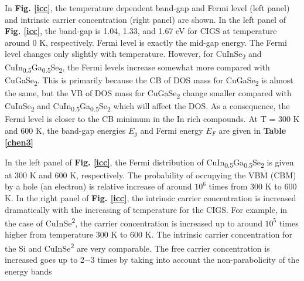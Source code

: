 \documentclass[a4paper, 12pt, titlepage,oneside,drop]{kthesis}
\begin{document}
In \textbf{Fig. \ref{icc}}, the temperature dependent band-gap and Fermi level (left panel) and intrinsic carrier concentration (right panel) are shown.  In the left panel of \textbf{Fig. \ref{icc}}, the band-gap is 1.04, 1.33,
and 1.67 eV for CIGS at temperature around 0 K, respectively. Fermi level is exactly the mid-gap energy. The Fermi level changes only slightly with temperature. However, 
for CuInSe\textsubscript{2} and CuIn\textsubscript{0.5}Ga\textsubscript{0.5}Se\textsubscript{2}, the Fermi levels increase somewhat more compared with CuGaSe\textsubscript{2}. This is primarily because the CB of DOS mass for 
CuGaSe\textsubscript{2} is almost the same, but the VB of DOS mass for CuGaSe\textsubscript{2} change smaller compared with CuInSe\textsubscript{2} and CuIn\textsubscript{0.5}Ga\textsubscript{0.5}Se\textsubscript{2} which will 
affect the DOS. As a consequence, the Fermi level is closer to the CB minimum in the In rich compounds. At T = 300 K and 600 K, the band-gap energies $E_g$ and Fermi energy $E_F$ are given in \textbf{Table \ref{chen3}}

\begin{table}[H]
\centering
 \captionsetup{width=1\textwidth}
\caption {Band-gap energies $E_g$ and Fermi energy $E_F$ at 300 K and 600 K, respectively.}\label{chen3}
\end{table}



In the left panel of \textbf{Fig. \ref{icc}}, the Fermi distribution of CuIn\textsubscript{0.5}Ga\textsubscript{0.5}Se\textsubscript{2} is given at 300 K and 600 K, respectively. The probability of occupying the VBM (CBM) by a hole (an electron) is 
relative increase of around $10^6$ times from 300 K to 600 K. In the right panel of \textbf{Fig. \ref{icc}}, the intrinsic carrier concentration is increased dramatically with the increasing of temperature for the CIGS. For example, in the case of CuInSe\textsuperscript{2}, 
the carrier concentration is increased up to around $10^{5}$ times higher from temperature 300 K to 600 K. The intrinsic carrier concentration for the Si and CuInSe\textsuperscript{2} are very comparable. The free carrier 
concentration is increased goes up to 2$-$3 times by taking into account the non-parabolicity of the energy bands
\end{document}

